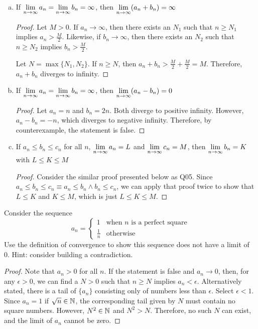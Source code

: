 \documentclass{agony}
\begin{document}
\begin{enumerate}[(a)]

  \item If $\lim\limits_{n\to\infty}a_n=\lim\limits_{n\to\infty}b_n=\infty$, then $\lim\limits_{n\to\infty}(a_n+b_n)=\infty$
        \begin{proof}
          Let $M>0$. If $a_n\to\infty$, then there exists an $N_1$ such that $n\geq N_1$ implies $a_n>\frac{M}{2}$. Likewise, if $b_n\to\infty$, then there exists an $N_2$ such that $n\geq N_2$ implies $b_n>\frac{M}{2}$.

          Let $N=\max \{N_1,N_2\}$. If $n\geq N$, then $a_n+b_n>\frac{M}{2}+\frac{M}{2}=M$.
          Therefore, $a_n+b_n$ diverges to infinity.
        \end{proof}

  \item If $\lim\limits_{n\to\infty}a_n=\lim\limits_{n\to\infty}b_n=\infty$, then $\lim\limits_{n\to\infty}(a_n-b_n)=0$
        \begin{proof}
          Let $a_n=n$ and $b_n=2n$. Both diverge to positive infinity. However, $a_n-b_n=-n$, which diverges to negative infinity. Therefore, by counterexample, the statement is false.
        \end{proof}

  \item If $a_n \leq b_n \leq c_n$ for all $n$, $\lim\limits_{n\to\infty}a_n=L$ and $\lim\limits_{n\to\infty}c_n=M$, then $\lim\limits_{n\to\infty}b_n=K$ with $L \leq K \leq M$
        \begin{proof}
          Consider the similar proof presented below as Q05.
          Since $a_n \leq b_n \leq c_n \equiv a_n \leq b_n \land b_n \leq c_n$, we can apply that proof twice to show that $L \leq K$ and $K \leq M$, which is just $L \leq K \leq M$.
        \end{proof}

\end{enumerate}



\question
Consider the sequence
\[
  a_n=\begin{cases}
    1           & \textrm{when $n$ is a perfect square} \\
    \frac{1}{n} & \textrm{otherwise}
  \end{cases}
\]
Use the definition of convergence to show this sequence does not have a limit of 0. Hint: consider building a contradiction.
\begin{proof}
  Note that $a_n>0$ for all $n$.
  If the statement is false and $a_n\to 0$, then, for any $\epsilon>0$, we can find a $N>0$ such that $n\geq N$ implies $a_n<\epsilon$.
  Alternatively stated, there is a tail of $\{a_n\}$ consisting only of numbers less than $\epsilon$.
  Select $\epsilon<1$. Since $a_n=1$ if $\sqrt{n}\in\mathbb{N}$, the corresponding tail given by $N$ must contain no square numbers.
  However, $N^2\in\mathbb{N}$ and $N^2>N$. Therefore, no such $N$ can exist, and the limit of $a_n$ cannot be zero.
\end{proof}
\end{document}
